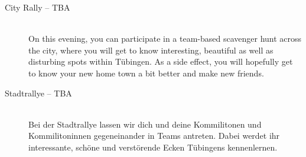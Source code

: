 \begin{description}


\ifml
	\item[City Rally -- TBA]~\\
	On this evening, you can participate in a team-based scavenger hunt across the city,
	where you will get to know interesting, beautiful as well as disturbing spots within Tübingen.
	As a side effect, you will hopefully get to know your new home town a bit better and make new friends.
\else
	\item[Stadtrallye -- TBA]~\\
	Bei der Stadtrallye lassen wir dich und deine Kommilitonen und Kommilitoninnen gegeneinander in Teams antreten.
	Dabei werdet ihr interessante, schöne und verstörende Ecken Tübingens kennenlernen.
\fi


\end{description}
